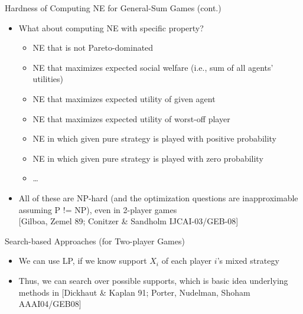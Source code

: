 \documentclass[11pt,aspectratio=169]{beamer}
\begin{document}
  \begin{frame}{Hardness of Computing NE for General-Sum Games (cont.)}
   \begin{itemize}[<+->]
    \item What about computing NE with \alert{specific property}?
    \begin{itemize}[<.->]
     \item NE that is not Pareto-dominated
     \item NE that maximizes expected social welfare (i.e., sum of all agents’ utilities)
     \item NE that maximizes expected utility of given agent
     \item NE that maximizes expected utility of worst-off player
     \item NE in which given pure strategy is played with positive probability
     \item NE in which given pure strategy is played with zero probability
     \item …
    \end{itemize}
    \item All of these are NP-hard (and the optimization questions are
 inapproximable assuming P != NP), even in 2-player games \\
 {\scriptsize [Gilboa, Zemel 89; Conitzer \& Sandholm IJCAI-03/GEB-08]}
   \end{itemize}
  \end{frame}

  \begin{frame}{Search-based Approaches (for Two-player Games)}
   \begin{itemize}
    \item<1-> We can use LP, if we know support $X_i$ of each player $i$’s mixed strategy
    \item<3-> Thus, we can search over possible supports, which is basic idea underlying methods in {\scriptsize \color[rgb]{0.29, 0.59, 0.9} [Dickhaut \& Kaplan 91; Porter, Nudelman, Shoham AAAI04/GEB08]}
   \end{itemize}
  \end{frame}
\end{document}
